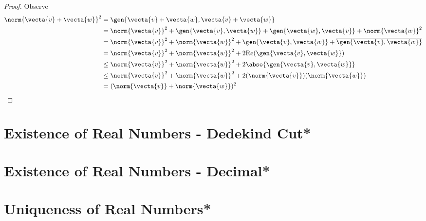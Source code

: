 \documentclass{report}
\begin{document}
\begin{proof}
Observe
\begin{align*}
\norm{\vecta{v}+\vecta{w}}^2&=\gen{\vecta{v}+\vecta{w},\vecta{v}+\vecta{w}}\\
&=\norm{\vecta{v}}^2+\gen{\vecta{v},\vecta{w}}+\gen{\vecta{w},\vecta{v}}+\norm{\vecta{w}}^2\\
&=\norm{\vecta{v}}^2+\norm{\vecta{w}}^2+\gen{\vecta{v},\vecta{w}}+\overline{\gen{\vecta{v},\vecta{w}}}\\
&=\norm{\vecta{v}}^2+\norm{\vecta{w}}^2+2\text{Re}(\gen{\vecta{v},\vecta{w}})\\
&\leq \norm{\vecta{v}}^2+\norm{\vecta{w}}^2+2\abso{\gen{\vecta{v},\vecta{w}}}\\
&\leq \norm{\vecta{v}}^2+\norm{\vecta{w}}^2+2(\norm{\vecta{v}})(\norm{\vecta{w}})\\
&=(\norm{\vecta{v}}+\norm{\vecta{w}})^2
\end{align*}
\end{proof}
\section{Existence of Real Numbers - Dedekind Cut*}
\section{Existence of Real Numbers - Decimal*}
\section{Uniqueness of Real Numbers*}
\end{document}
